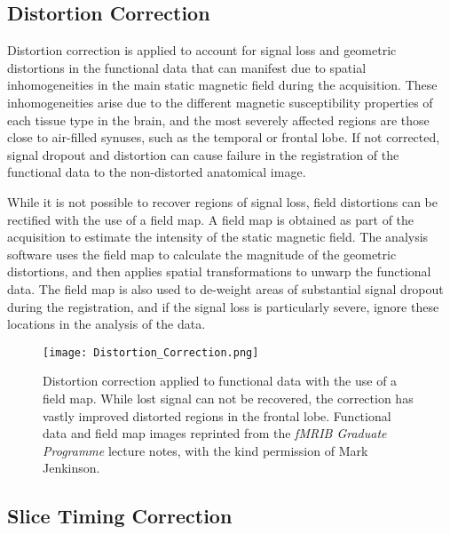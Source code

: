\subsection{Distortion Correction}

Distortion correction is applied to account for signal loss and geometric distortions in the functional data that can manifest due to spatial inhomogeneities in the main static magnetic field during the acquisition. These inhomogeneities arise due to the different magnetic susceptibility properties of each tissue type in the brain, and the most severely affected regions are those close to air-filled synuses, such as the temporal or frontal lobe. If not corrected, signal dropout and distortion can cause failure in the registration of the functional data to the non-distorted anatomical image. 

While it is not possible to recover regions of signal loss, field distortions can be rectified with the use of a field map. A field map is obtained as part of the acquisition to estimate the intensity of the static magnetic field. The analysis software uses the field map to calculate the magnitude of the geometric distortions, and then applies spatial transformations to unwarp the functional data.  The field map is also used to de-weight areas of substantial signal dropout during the registration, and if the signal loss is particularly severe, ignore these locations in the analysis of the data. 

\begin{figure}[!ht]
\centering
	\texttt{[image: Distortion\_Correction.png]}
\caption[Distortion correction applied to functional data with the use of a field map. While lost signal can not be recovered, the correction has vastly improved distorted regions in the frontal lobe. Functional data and field map images reprinted from the \textit{fMRIB Graduate Programme} lecture notes, with the kind permission of Mark Jenkinson.]{Distortion correction applied to functional data with the use of a field map. While lost signal can not be recovered, the correction has vastly improved distorted regions in the frontal lobe. Functional data and field map images reprinted from the \textit{fMRIB Graduate Programme} lecture notes\footnotemark, with the kind permission of Mark Jenkinson.}
\label{fig:Distortion_Correction}
\end{figure}

\subsection{Slice Timing Correction}

